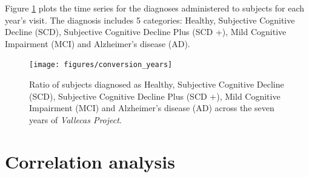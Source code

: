 \documentclass[11pt]{article}
\theoremstyle{definition}
\theoremstyle{remark}
\begin{document}
Figure \ref{fig:diag1} plots the time series for the diagnoses administered to subjects for each year's visit. The diagnosis includes 5 categories: Healthy, Subjective Cognitive Decline (SCD), Subjective Cognitive Decline Plus (SCD +), Mild Cognitive Impairment (MCI) and Alzheimer's disease (AD).
\begin{figure}[H]
        \centering
        \texttt{[image: figures/conversion\_years]}
        \caption{Ratio of subjects diagnosed as Healthy, Subjective Cognitive Decline (SCD), Subjective Cognitive Decline Plus (SCD +), Mild Cognitive Impairment (MCI) and Alzheimer's disease (AD) across the seven years of \emph{Vallecas Project}.} 
        \label{fig:diag1}
\end{figure}



\section{Correlation analysis}
\label{se:met}
\end{document}
